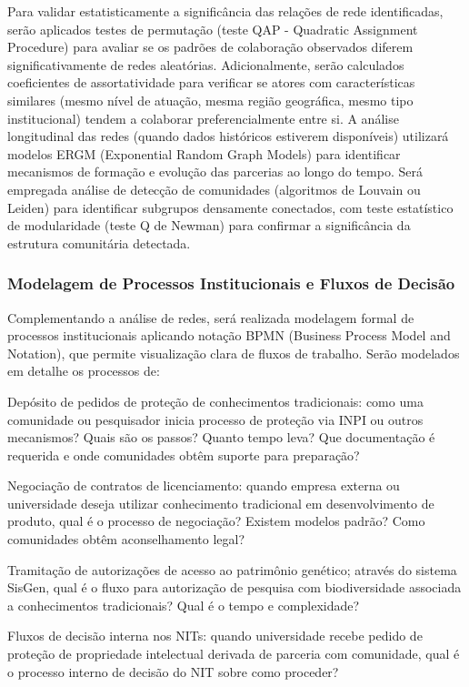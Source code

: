 Para validar estatisticamente a significância das relações de rede identificadas, serão aplicados testes de permutação (teste QAP - Quadratic Assignment Procedure) para avaliar se os padrões de colaboração observados diferem significativamente de redes aleatórias. Adicionalmente, serão calculados coeficientes de assortatividade para verificar se atores com características similares (mesmo nível de atuação, mesma região geográfica, mesmo tipo institucional) tendem a colaborar preferencialmente entre si. A análise longitudinal das redes (quando dados históricos estiverem disponíveis) utilizará modelos ERGM (Exponential Random Graph Models) para identificar mecanismos de formação e evolução das parcerias ao longo do tempo. Será empregada análise de detecção de comunidades (algoritmos de Louvain ou Leiden) para identificar subgrupos densamente conectados, com teste estatístico de modularidade (teste Q de Newman) para confirmar a significância da estrutura comunitária detectada.

\subsubsection{Modelagem de Processos Institucionais e Fluxos de Decisão}

Complementando a análise de redes, será realizada modelagem formal de processos institucionais aplicando notação BPMN (Business Process Model and Notation), que permite visualização clara de fluxos de trabalho. Serão modelados em detalhe os processos de:

Depósito de pedidos de proteção de conhecimentos tradicionais: como uma comunidade ou pesquisador inicia processo de proteção via INPI ou outros mecanismos? Quais são os passos? Quanto tempo leva? Que documentação é requerida e onde comunidades obtêm suporte para preparação?

Negociação de contratos de licenciamento: quando empresa externa ou universidade deseja utilizar conhecimento tradicional em desenvolvimento de produto, qual é o processo de negociação? Existem modelos padrão? Como comunidades obtêm aconselhamento legal?

Tramitação de autorizações de acesso ao patrimônio genético; através do sistema SisGen, qual é o fluxo para autorização de pesquisa com biodiversidade associada a conhecimentos tradicionais? Qual é o tempo e complexidade?

Fluxos de decisão interna nos NITs: quando universidade recebe pedido de proteção de propriedade intelectual derivada de parceria com comunidade, qual é o processo interno de decisão do NIT sobre como proceder?

